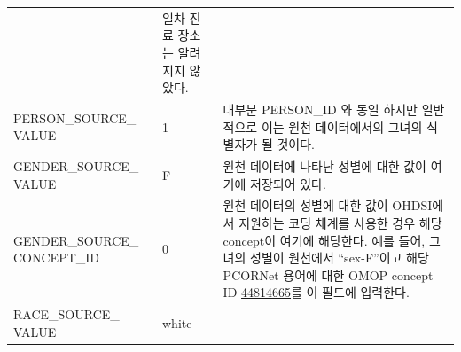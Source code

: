 \documentclass[10.5pt]{book}
\theoremstyle{definition}
\theoremstyle{definition}
\theoremstyle{definition}
\theoremstyle{remark}
\begin{document}
\begin{longtable}[]{@{}lll@{}}
\begin{minipage}[t]{0.16\columnwidth}
\strut
\end{minipage} & \begin{minipage}[t]{0.48\columnwidth}\raggedright\strut
일차 진료 장소는 알려지지 않았다.\strut
\end{minipage}\tabularnewline
\begin{minipage}[t]{0.28\columnwidth}\raggedright\strut
PERSON\_SOURCE\_ VALUE\strut
\end{minipage} & \begin{minipage}[t]{0.16\columnwidth}\raggedright\strut
1\strut
\end{minipage} & \begin{minipage}[t]{0.48\columnwidth}\raggedright\strut
대부분 PERSON\_ID 와 동일 하지만 일반적으로 이는 원천 데이터에서의
그녀의 식별자가 될 것이다.\strut
\end{minipage}\tabularnewline
\begin{minipage}[t]{0.28\columnwidth}\raggedright\strut
GENDER\_SOURCE\_ VALUE\strut
\end{minipage} & \begin{minipage}[t]{0.16\columnwidth}\raggedright\strut
F\strut
\end{minipage} & \begin{minipage}[t]{0.48\columnwidth}\raggedright\strut
원천 데이터에 나타난 성별에 대한 값이 여기에 저장되어 있다.\strut
\end{minipage}\tabularnewline
\begin{minipage}[t]{0.28\columnwidth}\raggedright\strut
GENDER\_SOURCE\_ CONCEPT\_ID\strut
\end{minipage} & \begin{minipage}[t]{0.16\columnwidth}\raggedright\strut
0\strut
\end{minipage} & \begin{minipage}[t]{0.48\columnwidth}\raggedright\strut
원천 데이터의 성별에 대한 값이 OHDSI에서 지원하는 코딩 체계를 사용한
경우 해당 concept이 여기에 해당한다. 예를 들어, 그녀의 성별이 원천에서
``sex-F''이고 해당 PCORNet 용어에 대한 OMOP concept ID
\href{http://athena.ohdsi.org/search-terms/terms/44814665}{44814665}를
이 필드에 입력한다.\strut
\end{minipage}\tabularnewline
\begin{minipage}[t]{0.28\columnwidth}\raggedright\strut
RACE\_SOURCE\_ VALUE\strut
\end{minipage} & \begin{minipage}[t]{0.16\columnwidth}\raggedright\strut
white\strut
\end{minipage} & \begin{minipage}[t]{0.48\columnwidth}\raggedright\strut

\end{minipage}
\end{longtable}
\end{document}
